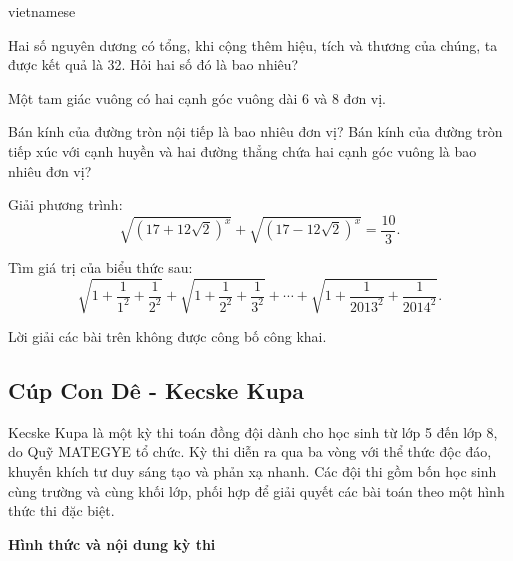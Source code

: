 \documentclass{article}
\begin{document}
\begin{otherlanguage*}{vietnamese}
\begin{problem*}
    Hai số nguyên dương có tổng, khi cộng thêm hiệu, tích và thương của chúng, ta được kết quả là 32. Hỏi hai số đó là bao nhiêu?
\end{problem*}

\begin{problem*}
    Một tam giác vuông có hai cạnh góc vuông dài 6 và 8 đơn vị.
    \begin{enumerate}[topsep=0pt, partopsep=0pt, itemsep=0pt]
        \ii Bán kính của đường tròn nội tiếp là bao nhiêu đơn vị?
        \ii Bán kính của đường tròn tiếp xúc với cạnh huyền và hai đường thẳng chứa hai cạnh góc vuông là bao nhiêu đơn vị?
    \end{enumerate}
\end{problem*}

\begin{problem*}
    Giải phương trình: 
    \[
        \sqrt{\left(17+12\sqrt{2}\right)^x} + \sqrt{\left(17-12\sqrt{2}\right)^x} = \frac{10}{3}.
    \]
\end{problem*}

\begin{problem*}
    Tìm giá trị của biểu thức sau: 
    \[
        \sqrt{1+\frac{1}{1^2}+\frac{1}{2^2}} + \sqrt{1+\frac{1}{2^2}+\frac{1}{3^2}} + \cdots + \sqrt{1+\frac{1}{2013^2}+\frac{1}{2014^2}}.
    \]
\end{problem*}

\begin{remark*}
    Lời giải các bài trên không được công bố công khai.
\end{remark*}

\newpage

\subsection{Cúp Con Dê - Kecske Kupa}

Kecske Kupa là một kỳ thi toán đồng đội dành cho học sinh từ lớp 5 đến lớp 8, do Quỹ MATEGYE tổ chức.
Kỳ thi diễn ra qua ba vòng với thể thức độc đáo, khuyến khích tư duy sáng tạo và phản xạ nhanh.
Các đội thi gồm bốn học sinh cùng trường và cùng khối lớp, phối hợp để giải quyết các bài toán theo một hình thức thi đặc biệt.

\textbf{Hình thức và nội dung kỳ thi}


\end{otherlanguage*}
\end{document}
